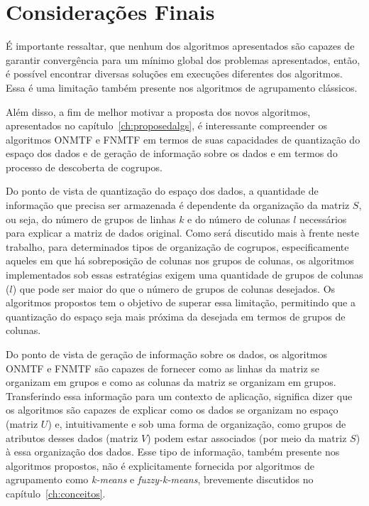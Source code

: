 \documentclass[
    12pt,                %
    oneside,            %
    a4paper,            %
    english,            %
    brazil                %
    ]{abntex2ppgsi}
\begin{document}

\section{Considerações Finais}


É importante ressaltar, que nenhum dos algoritmos apresentados são capazes de garantir convergência para um mínimo global dos problemas apresentados, então, é possível encontrar diversas soluções em execuções diferentes dos algoritmos.
Essa é uma limitação também presente nos algoritmos de agrupamento clássicos.

Além disso, a fim de melhor motivar a proposta dos novos algoritmos, apresentados no capítulo~\ref{ch:proposedalgs}, é interessante compreender os algoritmos ONMTF e FNMTF em termos de suas capacidades de quantização do espaço dos dados e de geração de informação sobre os dados e em termos do processo de descoberta de cogrupos.

Do ponto de vista de quantização do espaço dos dados, a quantidade de informação que precisa ser armazenada é dependente da organização da matriz $S$, ou seja, do número de grupos de linhas $k$ e do número de colunas $l$ necessários para explicar a matriz de dados original.
Como será discutido mais à frente neste trabalho, para determinados tipos de organização de cogrupos, especificamente aqueles em que há sobreposição de colunas nos grupos de colunas, os algoritmos implementados sob essas estratégias exigem uma quantidade de grupos de colunas ($l$) que pode ser maior do que o número de grupos de colunas desejados.
Os algoritmos propostos tem o objetivo de superar essa limitação, permitindo que a quantização do espaço seja mais próxima da desejada em termos de grupos de colunas.

Do ponto de vista de geração de informação sobre os dados, os algoritmos ONMTF e FNMTF são capazes de fornecer como as linhas da matriz se organizam em grupos e como as colunas da matriz se organizam em grupos.
Transferindo essa informação para um contexto de aplicação, significa dizer que os algoritmos são capazes de explicar como os dados se organizam no espaço (matriz $U$) e, intuitivamente e sob uma forma de organização, como grupos de atributos desses dados (matriz $V$) podem estar associados (por meio da matriz $S$) à essa organização dos dados.
Esse tipo de informação, também presente nos algoritmos propostos, não é explicitamente fornecida por algoritmos de agrupamento como \textit{k-means} e \textit{fuzzy-k-means}, brevemente discutidos no capítulo~\ref{ch:conceitos}.
\end{document}
